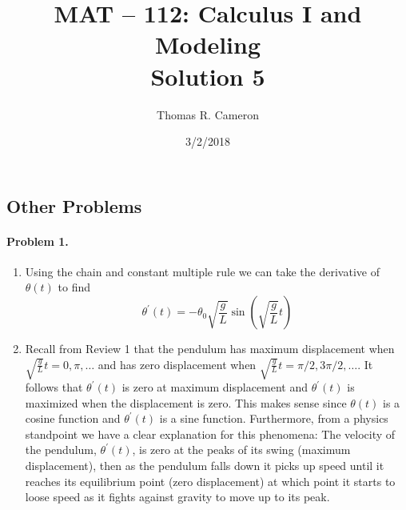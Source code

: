 \documentclass{article}
\title{MAT -- 112: Calculus I and Modeling\\
\large{Solution 5}}
\author{Thomas R. Cameron}
\date{3/2/2018}
\begin{document}
\maketitle

\subsection*{Other Problems}

\paragraph*{Problem 1.} 
\begin{enumerate}
\item	Using the chain and constant multiple rule we can take the derivative of $\theta(t)$ to find
\[
\theta^{'}(t)=-\theta_{0}\sqrt{\frac{g}{L}}\sin(\sqrt{\frac{g}{L}}t)
\]
\item	Recall from Review 1 that the pendulum has maximum displacement when $\sqrt{\frac{g}{L}}t=0,\pi,\ldots$ and has zero displacement when $\sqrt{\frac{g}{L}}t=\pi/2,3\pi/2,\ldots$. It follows that $\theta^{'}(t)$ is zero at maximum displacement and $\theta^{'}(t)$ is maximized when the displacement is zero. This makes sense since $\theta(t)$ is a cosine function and $\theta^{'}(t)$ is a sine function. Furthermore, from a physics standpoint we have a clear explanation for this phenomena: The velocity of the pendulum, $\theta^{'}(t)$, is zero at the peaks of its swing (maximum displacement), then as the pendulum falls down it picks up speed until it reaches its equilibrium point (zero displacement) at which point it starts to loose speed as it fights against gravity to move up to its peak. 
\end{enumerate}
\end{document}

